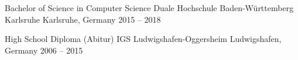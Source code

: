 \documentclass[10pt, a4paper]{cvhari}
\begin{document}
\medskip
    \education
        {Bachelor of Science in Computer Science}
        {Duale Hochschule Baden-Württemberg Karlsruhe} 
        {Karlsruhe, Germany}
        {2015 -- 2018}
        \par
        \dividergray
     
        \education
        {High School Diploma (Abitur)}
        {IGS Ludwigshafen-Oggersheim}
        {Ludwigshafen, Germany}
        {2006 -- 2015}

        \par
        \dividergray
\end{document}
